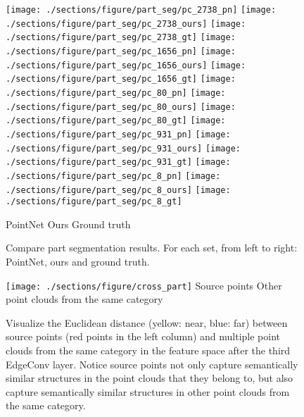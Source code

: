 \documentclass[acmtog]{acmart}
\begin{document}
\begin{figure}[t!]
  \centering
  \texttt{[image: ./sections/figure/part\_seg/pc\_2738\_pn]} 
  \texttt{[image: ./sections/figure/part\_seg/pc\_2738\_ours]} 
  \texttt{[image: ./sections/figure/part\_seg/pc\_2738\_gt]}
  \texttt{[image: ./sections/figure/part\_seg/pc\_1656\_pn]} 
  \texttt{[image: ./sections/figure/part\_seg/pc\_1656\_ours]} 
  \texttt{[image: ./sections/figure/part\_seg/pc\_1656\_gt]} 
  \texttt{[image: ./sections/figure/part\_seg/pc\_80\_pn]}
  \texttt{[image: ./sections/figure/part\_seg/pc\_80\_ours]} 
  \texttt{[image: ./sections/figure/part\_seg/pc\_80\_gt]} 
  \texttt{[image: ./sections/figure/part\_seg/pc\_931\_pn]} 
  \texttt{[image: ./sections/figure/part\_seg/pc\_931\_ours]} 
  \texttt{[image: ./sections/figure/part\_seg/pc\_931\_gt]} 
  \texttt{[image: ./sections/figure/part\_seg/pc\_8\_pn]} 
  \texttt{[image: ./sections/figure/part\_seg/pc\_8\_ours]} 
  \texttt{[image: ./sections/figure/part\_seg/pc\_8\_gt]}
 
  \hspace{0.01\textwidth} {PointNet} \hspace{0.1\textwidth}  {Ours} \hspace{0.08\textwidth}  {Ground truth}
  
  \caption{Compare part segmentation results. For each set, from left to right: PointNet, ours and ground truth.}
  \label{fig:part_segmentation}
\end{figure}

\begin{figure}[h!]
  \centering
  \texttt{[image: ./sections/figure/cross\_part]} 
  \hspace{0.05\textwidth} {Source points} \hspace{0.03\textwidth}  {Other point clouds from the same category } 
  
  \caption{Visualize the Euclidean distance (yellow: near, blue: far) between source points (red points in the left column) and multiple point clouds from the same category in the feature space after the third EdgeConv layer. Notice source points not only capture semantically similar structures in the point clouds that they belong to, but also capture semantically similar structures in other point clouds from the same category.}
  \label{fig:cross_part}
\end{figure}
\end{document}

